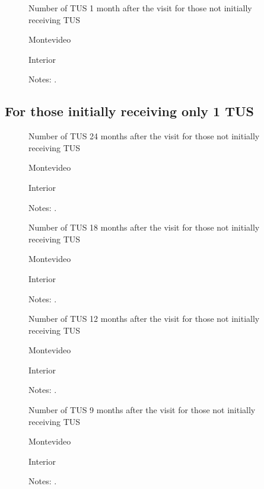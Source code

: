 \documentclass[12pt]{article}
\begin{document}
\begin{figure}[H]%
	\caption{Number of TUS 1 month after the visit for those not initially receiving TUS}%
	\centering
	\caption*{ {Montevideo}}
	\qquad
	\caption*{Interior}
	\label{fig:first_stage_noTus_tus1}%
	\caption*{ {\footnotesize Notes: .}}
\end{figure}

\subsection{For those initially receiving only 1 TUS}

\begin{figure}[H]%
	\caption{Number of TUS 24 months after the visit for those not initially receiving TUS}%
	\centering
	\caption*{ {Montevideo}}
	\qquad
	\caption*{Interior}
	\label{fig:first_stage_si1Tus_tus24}%
	\caption*{ {\footnotesize Notes: .}}
\end{figure}

\begin{figure}[H]%
	\caption{Number of TUS 18 months after the visit for those not initially receiving TUS}%
	\centering
	\caption*{ {Montevideo}}
	\qquad
	\caption*{Interior}
	\label{fig:first_stage_si1Tus_tus18}%
	\caption*{ {\footnotesize Notes: .}}
\end{figure}

\begin{figure}[H]%
	\caption{Number of TUS 12 months after the visit for those not initially receiving TUS}%
	\centering
	\caption*{ {Montevideo}}
	\qquad
	\caption*{Interior}
	\label{fig:first_stage_si1Tus_tus12}%
	\caption*{ {\footnotesize Notes: .}}
\end{figure}

\begin{figure}[H]%
	\caption{Number of TUS 9 months after the visit for those not initially receiving TUS}%
	\centering
	\caption*{ {Montevideo}}
	\qquad
	\caption*{Interior}
	\label{fig:first_stage_si1Tus_tus9}%
	\caption*{ {\footnotesize Notes: .}}
\end{figure}
\end{document}
